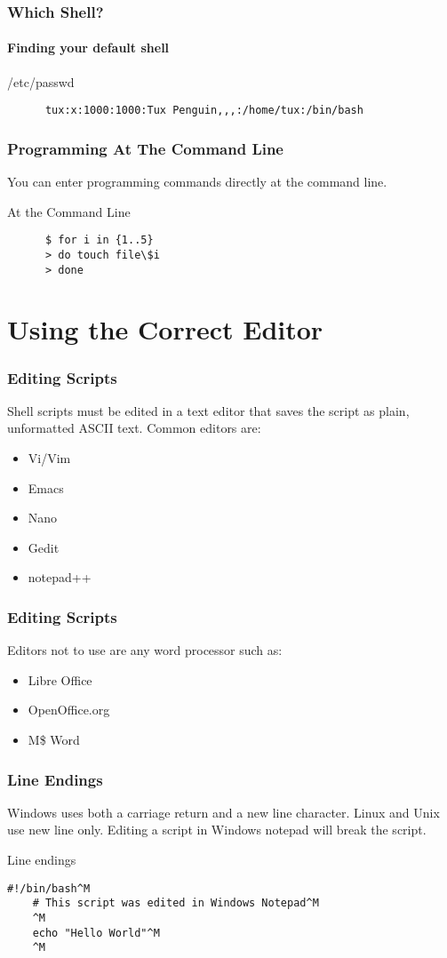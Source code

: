 \documentclass[12pt,handout,aspectratio=169]{beamer}
\begin{document}
\begin{frame}[fragile]
  \frametitle{Which Shell?}
  \framesubtitle{Finding your default shell}
  \begin{block}{/etc/passwd}
    \begin{verbatim}
      tux:x:1000:1000:Tux Penguin,,,:/home/tux:/bin/bash
    \end{verbatim}
  \end{block}
\end{frame}
\begin{frame}[fragile]
  \frametitle{Programming At The Command Line}
  You can enter programming commands directly at the command line.
   \begin{block}{At the Command Line}
    \begin{verbatim}
      $ for i in {1..5}
      > do touch file\$i
      > done
    \end{verbatim}
   \end{block}
\end{frame}

\section{Using the Correct Editor}

\begin{frame}
  \frametitle{Editing Scripts}
  Shell scripts must be edited in a text editor that saves the script as plain, unformatted ASCII text. Common editors are:
  \begin{itemize}
  \item Vi/Vim
  \item Emacs
  \item Nano
  \item Gedit
  \item notepad++
  \end{itemize}
\end{frame}
\begin{frame}
  \frametitle{Editing Scripts}
  Editors not to use are any word processor such as:
  \begin{itemize}
  \item Libre Office
  \item OpenOffice.org
  \item M\$ Word
  \end{itemize}
\end{frame}
\begin{frame}[fragile]
  \frametitle{Line Endings}
  Windows uses both a carriage return and a new line character.  Linux and Unix use new line only.  Editing a script in Windows notepad will break the script.
  \begin{block}{Line endings}
\begin{verbatim}
#!/bin/bash^M
    # This script was edited in Windows Notepad^M
    ^M
    echo "Hello World"^M
    ^M
\end{verbatim}
  \end{block}
\end{frame}
\end{document}
